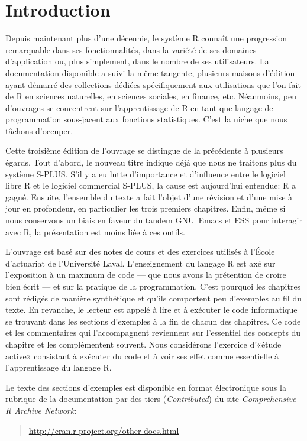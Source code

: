 \chapter*{Introduction}


Depuis maintenant plus d'une décennie, le système R connaît une
progression remarquable dans ses fonctionnalités, dans la variété de
ses domaines d'application ou, plus simplement, dans le nombre de ses
utilisateurs. La documentation disponible a suivi la même tangente,
plusieurs maisons d'édition ayant démarré des collections dédiées
spécifiquement aux utilisations que l'on fait de R en sciences
naturelles, en sciences sociales, en finance, etc. Néanmoins, peu
d'ouvrages se concentrent sur l'apprentissage de R en tant que langage
de programmation sous-jacent aux fonctions statistiques. C'est la
niche que nous tâchons d'occuper.

Cette troisième édition de l'ouvrage se distingue de la précédente
\citep{Goulet:introS:2007} à plusieurs égards. Tout d'abord, le
nouveau titre indique déjà que nous ne traitons plus du système
S-PLUS. S'il y a eu lutte d'importance et d'influence entre le
logiciel libre R et le logiciel commercial S-PLUS, la cause est
aujourd'hui entendue: R a gagné. Ensuite, l'ensemble du texte a fait
l'objet d'une révision et d'une mise à jour en profondeur, en
particulier les trois premiers chapitres. Enfin, même si nous
conservons un biais en faveur du tandem GNU~Emacs et ESS pour
interagir avec R, la présentation est moins liée à ces outils.

L'ouvrage est basé sur des notes de cours et des exercices utilisés à
l'École d'actuariat de l'Université Laval. L'enseignement du langage R
est axé sur l'exposition à un maximum de code --- que nous avons la
prétention de croire bien écrit --- et sur la pratique de la
programmation. C'est pourquoi les chapitres sont rédigés de manière
synthétique et qu'ils comportent peu d'exemples au fil du texte. En
revanche, le lecteur est appelé à lire et à exécuter le code
informatique se trouvant dans les sections d'exemples à la fin de
chacun des chapitres. Ce code et les commentaires qui l'accompagnent
reviennent sur l'essentiel des concepts du chapitre et les
complémentent souvent. Nous considérons l'exercice d'«étude active»
consistant à exécuter du code et à voir ses effet comme essentielle à
l'apprentissage du langage R.

Le texte des sections d'exemples est disponible en format électronique
sous la rubrique de la documentation par des tiers
(\emph{Contributed}) du site \emph{Comprehensive R Archive Network}:
\begin{quote}
  \url{http://cran.r-project.org/other-docs.html}
\end{quote}


